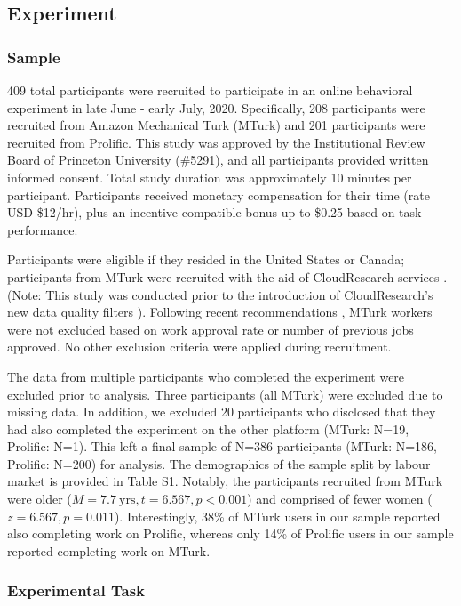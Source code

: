\documentclass[a4paper,notitlepage,12pt]{article}
\begin{document}
\subsection{Experiment}

\subsubsection{Sample}

409 total participants were recruited to participate in an online behavioral experiment in late June - early July, 2020. Specifically, 208 participants were recruited from Amazon Mechanical Turk (MTurk) and 201 participants were recruited from Prolific.  This study was approved by the Institutional Review Board of Princeton University (\#5291), and all participants provided written informed consent. Total study duration was approximately 10 minutes per participant. Participants received monetary compensation for their time (rate USD \$12/hr), plus an incentive-compatible bonus up to \$0.25 based on task performance. 

Participants were eligible if they resided in the United States or Canada; participants from MTurk were recruited with the aid of CloudResearch services \cite{litman2017turkprime}. (Note: This study was conducted prior to the introduction of CloudResearch's new data quality filters \cite{cloudresearch_2020}). Following recent recommendations \cite{robinson2019tapped}, MTurk workers were not excluded based on work approval rate or number of previous jobs approved. No other exclusion criteria were applied during recruitment. 

The data from multiple participants who completed the experiment were excluded prior to analysis. Three participants (all MTurk) were excluded due to missing data. In addition, we excluded 20 participants who disclosed that they had also completed the experiment on the other platform (MTurk: N=19, Prolific: N=1). This left a final sample of N=386 participants (MTurk: N=186, Prolific: N=200) for analysis. The demographics of the sample split by labour market is provided in Table S1. Notably, the participants recruited from MTurk were older ($M = 7.7 \ \text{yrs}, t = 6.567, p < 0.001$) and comprised of fewer women ($z = 6.567, p = 0.011$). Interestingly, 38\% of MTurk users in our sample reported also completing work on Prolific, whereas only 14\% of Prolific users in our sample reported completing work on MTurk. 

\subsubsection{Experimental Task}
\end{document}
